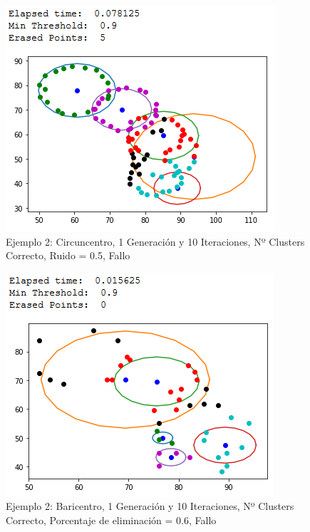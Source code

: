\documentclass[conference,a4paper]{IEEEtran}
\begin{document}
\begin{figure}[H]
\centering
\includegraphics[scale=0.65]{Experimentacion/Ejemplo2/ej2_c_1_10_lr_wrong}
\caption{Ejemplo 2: Circuncentro, 1 Generación y 10 Iteraciones,  Nº Clusters Correcto, Ruido = 0.5, Fallo\\}
\end{figure}

\begin{figure}[H]
\centering
\includegraphics[scale=0.65]{Experimentacion/Ejemplo2/ej2_b_1_10_me_wrong}
\caption{Ejemplo 2: Baricentro, 1 Generación y 10 Iteraciones,  Nº Clusters Correcto, Porcentaje de eliminación = 0.6, Fallo\\}
\end{figure}
\end{document}
